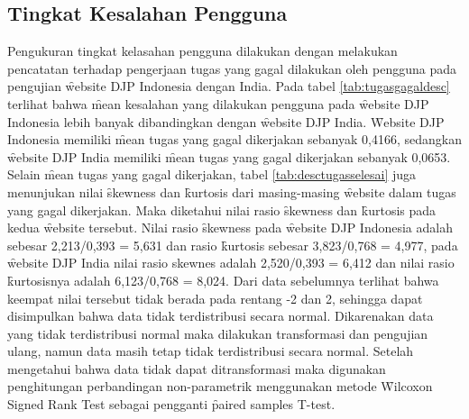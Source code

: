 \subsection{Tingkat Kesalahan Pengguna}
Pengukuran tingkat kelasahan pengguna dilakukan dengan melakukan pencatatan terhadap pengerjaan tugas yang gagal dilakukan oleh pengguna pada pengujian \f{website} DJP Indonesia dengan India. Pada tabel \ref{tab:tugasgagaldesc} terlihat bahwa \f{mean} kesalahan yang dilakukan pengguna pada \f{website} DJP Indonesia lebih banyak dibandingkan dengan \f{website} DJP India. \f{Website} DJP Indonesia memiliki \f{mean} tugas yang gagal dikerjakan sebanyak 0,4166, sedangkan \f{website} DJP India memiliki \f{mean} tugas yang gagal dikerjakan sebanyak 0,0653. Selain \f{mean} tugas yang gagal dikerjakan, tabel \ref{tab:desctugasselesai} juga menunjukan nilai \f{skewness} dan \f{kurtosis} dari masing-masing \f{website} dalam tugas yang gagal dikerjakan. Maka diketahui nilai rasio \f{skewness} dan \f{kurtosis} pada kedua \f{website} tersebut. Nilai rasio \f{skewness} pada \f{website} DJP Indonesia adalah sebesar 2,213/0,393 = 5,631 dan rasio \f{kurtosis} sebesar 3,823/0,768 = 4,977, pada \f{website} DJP India nilai rasio skewnes adalah 2,520/0,393 = 6,412 dan nilai rasio \f{kurtosis}nya adalah 6,123/0,768 = 8,024. Dari data sebelumnya terlihat bahwa keempat nilai tersebut tidak berada pada rentang -2 dan 2, sehingga dapat disimpulkan bahwa data tidak terdistribusi secara normal. Dikarenakan data yang tidak terdistribusi normal maka dilakukan transformasi dan pengujian ulang, namun data masih tetap tidak terdistribusi secara normal. Setelah mengetahui bahwa data tidak dapat ditransformasi maka digunakan penghitungan perbandingan non-parametrik menggunakan metode \f{Wilcoxon Signed Rank Test} sebagai pengganti \f{paired samples T-test}.
